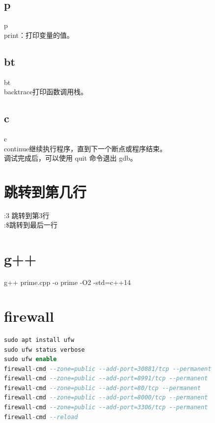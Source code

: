 \documentclass[12pt,twiside,a4paper]{book}
\numberwithin{chapter}{part}
\begin{document}
\subsection{p}
p\\
print：打印变量的值。
\subsection{bt}
bt\\
backtrace打印函数调用栈。
\subsection{c}
c\\
continue继续执行程序，直到下一个断点或程序结束。\\
调试完成后，可以使用 quit 命令退出 gdb。

\section{跳转到第几行}
:3 跳转到第3行\\
:\$跳转到最后一行

\section{g++}
g++ prime.cpp -o prime -O2 -std=c++14

\section{firewall}
\begin{lstlisting}[language=sql,breaklines = true]
sudo apt install ufw
sudo ufw status verbose
sudo ufw enable
firewall-cmd --zone=public --add-port=30881/tcp --permanent
firewall-cmd --zone=public --add-port=8991/tcp --permanent
firewall-cmd --zone=public --add-port=80/tcp --permanent
firewall-cmd --zone=public --add-port=8000/tcp --permanent
firewall-cmd --zone=public --add-port=3306/tcp --permanent
firewall-cmd --reload
\end{lstlisting}

\clearpage
\end{document}
